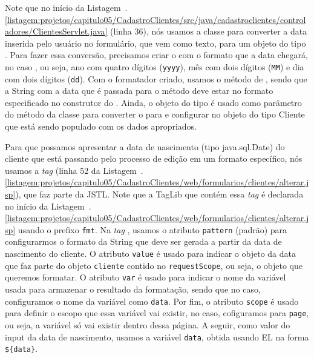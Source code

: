 Note que no início da Listagem~\thechapter.\ref{listagem:projetos/capitulo05/CadastroClientes/src/java/cadastroclientes/controladores/ClientesServlet.java} (linha 36), nós usamos a classe\linebreak%
 para converter a data inserida pelo usuário no formulário, que vem como texto, para um objeto do tipo . Para fazer essa conversão, precisamos criar o  com o formato que a data chegará, no caso , ou seja, ano com quatro dígitos (\texttt{yyyy}), mês com dois dígitos (\texttt{MM}) e dia com dois dígitos (\texttt{dd}). Com o formatador criado, usamos o método  de , sendo que a String com a data que é passada para o método  deve estar no formato especificado no construtor do . Ainda, o objeto do tipo  é usado como parâmetro do método  da classe  para converter o  para  e configurar no objeto do tipo Cliente que está sendo populado com os dados apropriados.


Para que possamos apresentar a data de nascimento (tipo java.sql.Date) do cliente que está passando pelo processo de edição em um formato específico, nós usamos a \textit{tag}  (linha 52 da Listagem~\thechapter.\ref{listagem:projetos/capitulo05/CadastroClientes/web/formularios/clientes/alterar.jsp}), que faz parte da JSTL. Note que a TagLib que contém essa \textit{tag} é declarada no início da Listagem~\thechapter.\ref{listagem:projetos/capitulo05/CadastroClientes/web/formularios/clientes/alterar.jsp} usando o prefixo \texttt{fmt}. Na \textit{tag} , usamos o atributo \texttt{pattern} (padrão) para configurarmos o formato da String que deve ser gerada a partir da data de nascimento do cliente. O atributo \texttt{value} é usado para indicar o objeto da data que faz parte do objeto \texttt{cliente} contido no \texttt{requestScope}, ou seja, o objeto que queremos formatar. O atributo \texttt{var} é usado para indicar o nome da variável usada para armazenar o resultado da formatação, sendo que no caso, configuramos o nome da variável como \texttt{data}. Por fim, o atributo \texttt{scope} é usado para definir o escopo que essa variável vai existir, no caso, cofiguramos para \texttt{page}, ou seja, a variável só vai existir dentro dessa página. A seguir, como valor do input da data de nascimento, usamos a variável \texttt{data}, obtida usando EL na forma \texttt{\$\{data\}}.


